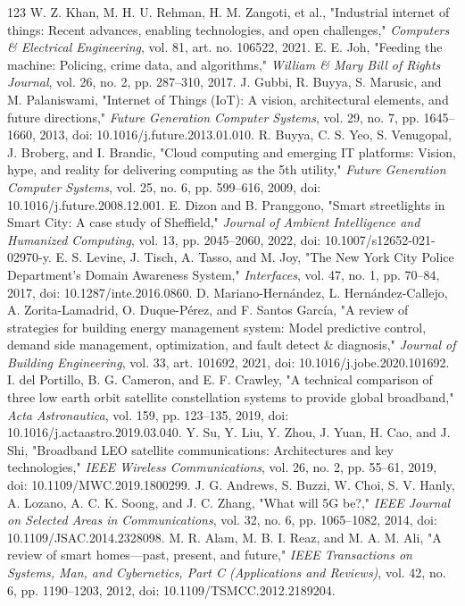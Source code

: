\documentclass[journal]{IEEEtran}
\begin{document}
\begin{thebibliography}{123}
 W. Z. Khan, M. H. U. Rehman, H. M. Zangoti, et al., "Industrial internet of things: Recent advances, enabling technologies, and open challenges," \emph{Computers \& Electrical Engineering}, vol. 81, art. no. 106522, 2021.
 E. E. Joh, "Feeding the machine: Policing, crime data, and algorithms," \emph{William \& Mary Bill of Rights Journal}, vol. 26, no. 2, pp. 287--310, 2017.
 J. Gubbi, R. Buyya, S. Marusic, and M. Palaniswami, "Internet of Things (IoT): A vision, architectural elements, and future directions," \emph{Future Generation Computer Systems}, vol. 29, no. 7, pp. 1645--1660, 2013, doi: 10.1016/j.future.2013.01.010.
 R. Buyya, C. S. Yeo, S. Venugopal, J. Broberg, and I. Brandic, "Cloud computing and emerging IT platforms: Vision, hype, and reality for delivering computing as the 5th utility," \emph{Future Generation Computer Systems}, vol. 25, no. 6, pp. 599--616, 2009, doi: 10.1016/j.future.2008.12.001.
 E. Dizon and B. Pranggono, "Smart streetlights in Smart City: A case study of Sheffield," \emph{Journal of Ambient Intelligence and Humanized Computing}, vol. 13, pp. 2045--2060, 2022, doi: 10.1007/s12652-021-02970-y.
 E. S. Levine, J. Tisch, A. Tasso, and M. Joy, "The New York City Police Department's Domain Awareness System," \emph{Interfaces}, vol. 47, no. 1, pp. 70--84, 2017, doi: 10.1287/inte.2016.0860.
 D. Mariano-Hern\'andez, L. Hern\'andez-Callejo, A. Zorita-Lamadrid, O. Duque-P\'erez, and F. Santos Garc\'ia, "A review of strategies for building energy management system: Model predictive control, demand side management, optimization, and fault detect \& diagnosis," \emph{Journal of Building Engineering}, vol. 33, art. 101692, 2021, doi: 10.1016/j.jobe.2020.101692.
 I. del Portillo, B. G. Cameron, and E. F. Crawley, "A technical comparison of three low earth orbit satellite constellation systems to provide global broadband," \emph{Acta Astronautica}, vol. 159, pp. 123--135, 2019, doi: 10.1016/j.actaastro.2019.03.040.
 Y. Su, Y. Liu, Y. Zhou, J. Yuan, H. Cao, and J. Shi, "Broadband LEO satellite communications: Architectures and key technologies," \emph{IEEE Wireless Communications}, vol. 26, no. 2, pp. 55--61, 2019, doi: 10.1109/MWC.2019.1800299.
 J. G. Andrews, S. Buzzi, W. Choi, S. V. Hanly, A. Lozano, A. C. K. Soong, and J. C. Zhang, "What will 5G be?," \emph{IEEE Journal on Selected Areas in Communications}, vol. 32, no. 6, pp. 1065--1082, 2014, doi: 10.1109/JSAC.2014.2328098.
 M. R. Alam, M. B. I. Reaz, and M. A. M. Ali, "A review of smart homes---past, present, and future," \emph{IEEE Transactions on Systems, Man, and Cybernetics, Part C (Applications and Reviews)}, vol. 42, no. 6, pp. 1190--1203, 2012, doi: 10.1109/TSMCC.2012.2189204.

\end{thebibliography}
\end{document}
